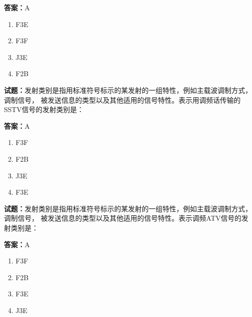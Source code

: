 \documentclass{ctexbook}
\begin{document}
\textbf{答案：}A 

\begin{enumerate}[leftmargin=3em]
  \item F3E 

  \item F3F 

  \item J3E 

  \item F2B 

\end{enumerate}





\vspace{1em}

\textbf{试题：}发射类别是指用标准符号标示的某发射的一组特性，例如主载波调制方式，调制信号，
被发送信息的类型以及其他适用的信号特性。表示用调频话传输的SSTV信号的发射类别是： 

\textbf{答案：}A 

\begin{enumerate}[leftmargin=3em]
  \item F3F 

  \item F2B 

  \item J3E 

  \item F3E 

\end{enumerate}






\vspace{1em}

\textbf{试题：}发射类别是指用标准符号标示的某发射的一组特性，例如主载波调制方式，调制信号，
被发送信息的类型以及其他适用的信号特性。表示调频ATV信号的发射类别是： 

\textbf{答案：}A 

\begin{enumerate}[leftmargin=3em]
  \item F3F 

  \item F2B 

  \item F3E 

  \item J3E 

\end{enumerate}
\end{document}
